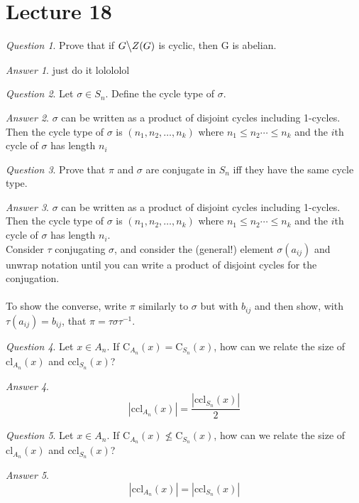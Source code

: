 \documentclass[]{article}
\theoremstyle{remark}
\theoremstyle{qnstyle}
\newtheorem{question}{Question}
\theoremstyle{answerstyle}
\newtheorem*{answer}{Answer}
\begin{document}
\section* {Lecture 18}
{
    \begin{question}
        Prove that if $G \big\backslash Z(G)$ is cyclic, then G is abelian.
    \end{question}
    \begin{answer}
        just do it lolololol
    \end{answer}
}
{
    \begin{question}
        Let $\sigma \in S_n$. Define the cycle type of $\sigma$.
    \end{question}
    \begin{answer}
        $\sigma$ can be written as a product of disjoint cycles including 1-cycles. Then the cycle type of $\sigma$ is 
        $(n_1, n_2, \ldots, n_k)$ where $n_1 \leq n_2 \cdots \leq n_k$ and the $i$th cycle of $\sigma$ has length $n_i$
    \end{answer}
}
{
    \begin{question}
        Prove that $\pi$ and $\sigma$ are conjugate in $S_n$ iff they have the same cycle type.
    \end{question}
    \begin{answer}
        $\sigma$ can be written as a product of disjoint cycles including 1-cycles. Then the cycle type of $\sigma$ is 
        $(n_1, n_2, \ldots, n_k)$ where $n_1 \leq n_2 \cdots \leq n_k$ and the $i$th cycle of $\sigma$ has length $n_i$. \\
        Consider $\tau$ conjugating $\sigma$, and consider the (general!) element $\sigma(a_{ij})$ and unwrap notation until
        you can write a product of disjoint cycles for the conjugation. \\ \\
        To show the converse, write $\pi$ similarly to $\sigma$ but with $b_{ij}$ and then show, with $\tau(a_{ij}) = b_{ij}$, that $\pi = \tau \sigma \tau^{-1}$.
    \end{answer}
}
{
    \begin{question}
        Let $x \in A_n$.  If $\text{C}_{A_n}(x) = \text{C}_{S_n}(x)$, how can we relate
        the size of $\text{cl}_{A_n}(x)$ and $\text{ccl}_{S_n}(x)$?
    \end{question}
    \begin{answer}
        $$|\text{ccl}_{A_n}(x)| = \frac{|\text{ccl}_{S_n}(x)|}{2}$$
    \end{answer}
}
{
    \begin{question}
        Let $x \in A_n$.  If $\text{C}_{A_n}(x) \nleq  \text{C}_{S_n}(x)$, how can we relate
        the size of $\text{cl}_{A_n}(x)$ and $\text{ccl}_{S_n}(x)$?
    \end{question}
    \begin{answer}
        $$|\text{ccl}_{A_n}(x)| = {|\text{ccl}_{S_n}(x)|}$$
    \end{answer}
}
\end{document}
